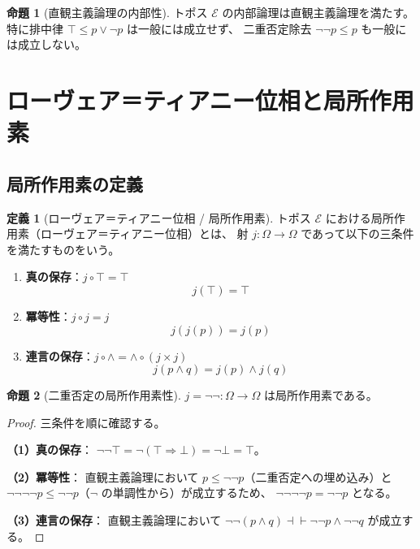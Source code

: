 \documentclass[11pt,a4paper]{article}
\theoremstyle{definition}
\newtheorem{definition}{定義}[section]
\newtheorem{proposition}{命題}[section]
\newcommand{\topos}{\mathcal{E}}
\begin{document}
\begin{proposition}[直観主義論理の内部性]
トポス $\topos$ の内部論理は直観主義論理を満たす。
特に排中律 $\top \leq p \lor \neg p$ は一般には成立せず、
二重否定除去 $\neg\neg p \leq p$ も一般には成立しない。
\end{proposition}

\section{ローヴェア＝ティアニー位相と局所作用素}

\subsection{局所作用素の定義}

\begin{definition}[ローヴェア＝ティアニー位相 / 局所作用素]
トポス $\topos$ における局所作用素（ローヴェア＝ティアニー位相）とは、
射 $j: \Omega \to \Omega$ であって以下の三条件を満たすものをいう。

\begin{enumerate}
\item \textbf{真の保存}：$j \circ \top = \top$
  \[
  j(\top) = \top
  \]

\item \textbf{冪等性}：$j \circ j = j$
  \[
  j(j(p)) = j(p)
  \]

\item \textbf{連言の保存}：$j \circ \land = \land \circ (j \times j)$
  \[
  j(p \land q) = j(p) \land j(q)
  \]
\end{enumerate}
\end{definition}

\begin{proposition}[二重否定の局所作用素性]
$j = \neg\neg: \Omega \to \Omega$ は局所作用素である。
\end{proposition}

\begin{proof}
三条件を順に確認する。

\textbf{（1）真の保存}：
$\neg\neg\top = \neg(\top \Rightarrow \bot) = \neg\bot = \top$。

\textbf{（2）冪等性}：
直観主義論理において
$p \leq \neg\neg p$（二重否定への埋め込み）と
$\neg\neg\neg\neg p \leq \neg\neg p$（$\neg$ の単調性から）が成立するため、
$\neg\neg\neg\neg p = \neg\neg p$ となる。

\textbf{（3）連言の保存}：
直観主義論理において
$\neg\neg(p \land q) \dashv\vdash \neg\neg p \land \neg\neg q$
が成立する。
\end{proof}
\end{document}
